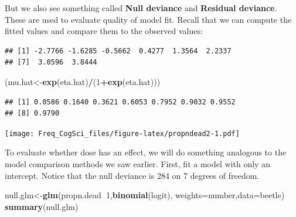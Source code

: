 \documentclass[12pt,]{krantz}
\newenvironment{Shaded}{\begin{snugshade}}{\end{snugshade}}
\newcommand{\CommentTok}[1]{\textcolor[rgb]{0.56,0.35,0.01}{\textit{#1}}}
\newcommand{\DataTypeTok}[1]{\textcolor[rgb]{0.13,0.29,0.53}{#1}}
\newcommand{\DecValTok}[1]{\textcolor[rgb]{0.00,0.00,0.81}{#1}}
\newcommand{\FloatTok}[1]{\textcolor[rgb]{0.00,0.00,0.81}{#1}}
\newcommand{\KeywordTok}[1]{\textcolor[rgb]{0.13,0.29,0.53}{\textbf{#1}}}
\newcommand{\NormalTok}[1]{#1}
\newcommand{\OperatorTok}[1]{\textcolor[rgb]{0.81,0.36,0.00}{\textbf{#1}}}
\newcommand{\StringTok}[1]{\textcolor[rgb]{0.31,0.60,0.02}{#1}}
\begin{document}
But we also see something called \textbf{Null deviance} and \textbf{Residual deviance}. These are used to evaluate quality of model fit. Recall that we can compute the fitted values and compare them to the observed values:

\begin{Shaded}
\end{Shaded}

\begin{verbatim}
## [1] -2.7766 -1.6285 -0.5662  0.4277  1.3564  2.2337
## [7]  3.0596  3.8444
\end{verbatim}

\begin{Shaded}
\begin{Highlighting}[]
\NormalTok{(mu.hat<-}\KeywordTok{exp}\NormalTok{(eta.hat)}\OperatorTok{/}\NormalTok{(}\DecValTok{1}\OperatorTok{+}\KeywordTok{exp}\NormalTok{(eta.hat)))}
\end{Highlighting}
\end{Shaded}

\begin{verbatim}
## [1] 0.0586 0.1640 0.3621 0.6053 0.7952 0.9032 0.9552
## [8] 0.9790
\end{verbatim}

\begin{Shaded}
\end{Shaded}

\texttt{[image: Freq\_CogSci\_files/figure-latex/propndead2-1.pdf]}

To evaluate whether dose has an effect, we will do something analogous to the model comparison methods we saw earlier. First, fit a model with only an intercept. Notice that the null deviance is 284 on 7 degrees of freedom.

\begin{Shaded}
\begin{Highlighting}[]
\NormalTok{null.glm<-}\KeywordTok{glm}\NormalTok{(propn.dead}\OperatorTok{~}\DecValTok{1}\NormalTok{,}\KeywordTok{binomial}\NormalTok{(logit),}
          \DataTypeTok{weights=}\NormalTok{number,}\DataTypeTok{data=}\NormalTok{beetle)}
\KeywordTok{summary}\NormalTok{(null.glm)}
\end{Highlighting}
\end{Shaded}
\end{document}
